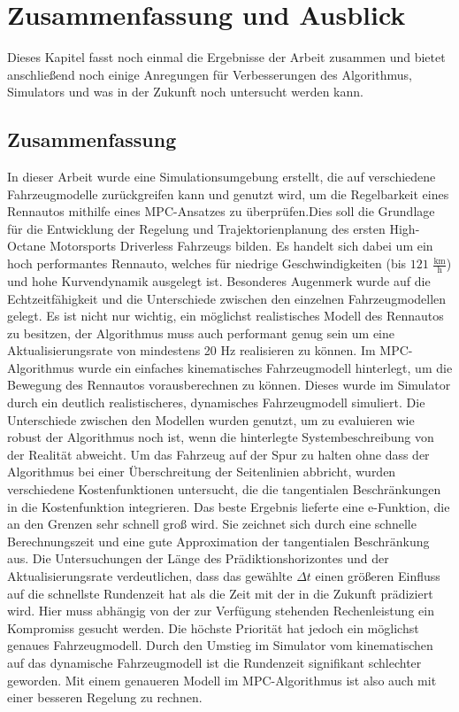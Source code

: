 \documentclass{like}
\begin{document}
\chapter[Zusammenfassung]{Zusammenfassung und Ausblick}
Dieses Kapitel fasst noch einmal die Ergebnisse der Arbeit zusammen und bietet an\-schlie\-ßend noch einige Anregungen für Verbesserungen des Algorithmus, Simulators und was in der Zukunft noch untersucht werden kann.
\section{Zusammenfassung}
In dieser Arbeit wurde eine Simulationsumgebung erstellt, die auf verschiedene Fahr\-zeug\-mo\-delle zurückgreifen kann und genutzt wird, um die Regelbarkeit eines Rennautos mithilfe eines \ac{MPC}-Ansatzes zu überprüfen.Dies soll die Grundlage für die Entwicklung der Regelung und Trajektorienplanung des ersten High-Octane Motorsports Driverless Fahrzeugs bilden. Es handelt sich dabei um ein hoch performantes Rennauto, welches für niedrige Ge\-schwin\-dig\-kei\-ten (bis $121$ $\frac{\text{km}}{\text{h}}$) und hohe Kurvendynamik ausgelegt ist. Besonderes Augenmerk wurde auf die Echtzeitfähigkeit und die Unterschiede zwischen den einzelnen Fahrzeugmodellen gelegt. Es ist nicht nur wichtig, ein möglichst realistisches Modell des Rennautos zu besitzen, der Algorithmus muss auch performant genug sein um eine Aktualisierungsrate von mindestens 20 Hz realisieren zu können. 
Im \ac{MPC}-Algorithmus wurde ein einfaches kinematisches Fahrzeugmodell hinterlegt, um die Be\-we\-gung des Rennautos vorausberechnen zu können. Dieses wurde im Simulator durch ein deutlich realistischeres, dynamisches Fahrzeugmodell simuliert. Die Unterschiede zwischen den Modellen wurden genutzt, um zu evaluieren wie robust der Algorithmus noch ist, wenn die hinterlegte Systembeschreibung von der Realität abweicht. Um das Fahrzeug auf der Spur zu halten ohne dass der Algorithmus bei einer Überschreitung der Seitenlinien abbricht, wurden verschiedene Kostenfunktionen untersucht, die die tangentialen Beschränkungen in die Kostenfunktion integrieren. Das beste Ergebnis lieferte eine e-Funktion, die an den Grenzen sehr schnell groß wird. Sie zeichnet sich durch eine schnelle Berechnungszeit und eine gute Approximation der tangentialen Beschränkung aus. Die Untersuchungen der Länge des Prädiktionshorizontes und der Aktualisierungsrate verdeutlichen, dass das gewählte $\Delta t$ einen größeren Einfluss auf die schnellste Rundenzeit hat als die Zeit mit der in die Zukunft prädiziert wird. Hier muss abhängig von der zur Verfügung stehenden Rechenleistung ein Kompromiss gesucht werden. Die höchste Priorität hat jedoch ein möglichst genaues Fahrzeugmodell. Durch den Umstieg im Simulator vom kinematischen auf das dynamische Fahrzeugmodell ist die Rundenzeit signifikant schlechter geworden. Mit einem genaueren Modell im \ac{MPC}-Algorithmus ist also auch mit einer besseren Regelung zu rechnen.  
\end{document}
